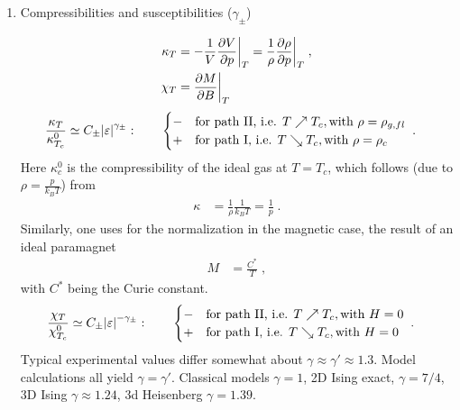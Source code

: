 \begin{enumerate}
\item Compressibilities and susceptibilities ($\gamma_{\pm}$)


%
\begin{align*}
\kappa_{T} &= -\frac{1}{V}\frac{\partial V}{\partial p}\bigg|_{T} = \frac{1}{\rho} \frac{\partial \rho}{\partial p}\bigg|_{T}\;,\\
\chi_{T} &= \frac{\partial M}{\partial B}\bigg|_{T}
\end{align*}
%
\begin{align}\label{eq:}
\frac{\kappa_{T}}{\kappa^{0}_{T_{c}}}&\simeq C_{\pm} \abs{\varepsilon}^{\gamma_{\pm}}
:\qquad \begin{cases}
- &\text{for path II, i.e. } T \nearrow 	T_{c}, \text{with } \rho=\rho_{g,fl}\\
 + &\text{for path I, i.e. } T \searrow 	T_{c}, \text{with } \rho=\rho_{c}
\end{cases}\;.
\end{align}
%
Here $\kappa^{0}_{c}$ is the compressibility of the ideal gas at $T=T_{c}$, which follows (due to $\rho=\frac{p}{k_{B}T}$) from
%
\begin{align*}
\kappa &= \frac{1}{\rho} \frac{1}{k_{B}T} = \frac{1}{p}\;.
\end{align*}
%
Similarly, one uses for the normalization in the magnetic case, the result of an ideal paramagnet
%
\begin{align*}
M &=\frac{C^{*}}{T}\;,
\end{align*}
%
with $C^{*}$ being the Curie constant.
\begin{align}\label{eq:}
\frac{\chi_{T}}{\chi^{0}_{T_{c}}}&\simeq C_{\pm} \abs{\varepsilon}^{-\gamma_{\pm}}
:\qquad \begin{cases}
-&\text{for path II, i.e. } T \nearrow 	T_{c}, \text{with } H=0\\
 +&\text{for path I, i.e. } T \searrow 	T_{c}, \text{with } H=0
\end{cases}\;.
\end{align}
%
Typical experimental values differ somewhat about $\gamma\approx \gamma' \approx 1.3$.
Model calculations all yield $\gamma=\gamma'$. Classical models $\gamma=1$, 2D Ising exact,
$\gamma =7/4$, 3D Ising $\gamma\approx 1.24$, 3d Heisenberg $\gamma=1.39$.


\end{enumerate}
